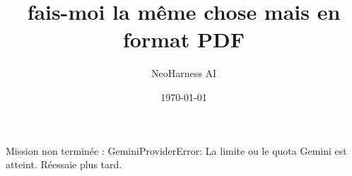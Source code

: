 \documentclass[11pt,a4paper]{article}
\title{fais-moi la même chose mais en format PDF}
\author{NeoHarness AI}
\date{\today}
\begin{document}
\maketitle

Mission non terminée : GeminiProviderError: La limite ou le quota Gemini est atteint. Réessaie plus tard.
\end{document}
